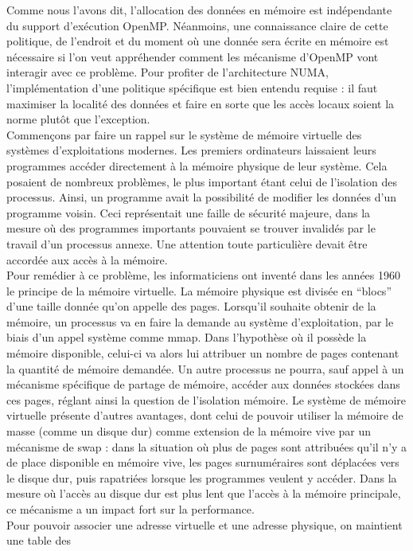 \documentclass{report}
\begin{document}
Comme nous l'avons dit, l'allocation des données en mémoire est indépendante du support d'exécution OpenMP.
Néanmoins, une connaissance claire de cette politique, de l'endroit et du moment où une donnée sera écrite
en mémoire est nécessaire si l'on veut appréhender comment les mécanisme d'OpenMP vont interagir avec ce
problème. Pour profiter de l'architecture NUMA, l'implémentation d'une politique spécifique est bien 
entendu requise : il faut maximiser la localité des données et faire en sorte que les accès locaux soient
la norme plutôt que l'exception. 
\\Commençons par faire un rappel sur le système de mémoire virtuelle des systèmes d'exploitations modernes.
Les premiers ordinateurs laissaient leurs programmes accéder directement à la mémoire physique de leur
système. Cela posaient de nombreux problèmes, le plus important étant celui de l'isolation des processus.
Ainsi, un programme avait la possibilité de modifier les données d'un programme voisin. Ceci représentait
une faille de sécurité majeure, dans la mesure où des programmes importants pouvaient se trouver invalidés
par le travail d'un processus annexe. Une attention toute particulière devait être accordée aux accès 
à la mémoire.
\\Pour remédier à ce problème, les informaticiens ont inventé dans les années 1960 le principe de la 
mémoire virtuelle. La mémoire physique est divisée en ``blocs'' d'une taille donnée qu'on appelle
des pages. Lorsqu'il souhaite obtenir de la mémoire, un processus va en faire la demande au système
d'exploitation, par le biais d'un appel système comme mmap. Dans l'hypothèse où il possède la mémoire 
disponible, celui-ci va alors lui attribuer un nombre de pages contenant la quantité de mémoire 
demandée. Un autre processus ne pourra, sauf appel à un mécanisme spécifique de partage de mémoire, 
accéder aux données stockées dans ces pages, réglant ainsi la question de l'isolation mémoire. Le 
système de mémoire virtuelle présente d'autres avantages, dont celui de pouvoir utiliser la mémoire 
de masse (comme un disque dur) comme extension de la mémoire vive par un mécanisme de swap : dans 
la situation où plus de pages sont attribuées qu'il n'y a de place disponible en mémoire vive, les 
pages surnuméraires sont déplacées vers le disque dur, puis rapatriées lorsque les programmes veulent
y accéder. Dans la mesure où l'accès au disque dur est plus lent que l'accès à la mémoire principale,
ce mécanisme a un impact fort sur la performance.
\\Pour pouvoir associer une adresse virtuelle et une adresse physique, on maintient une table des 
\end{document}
